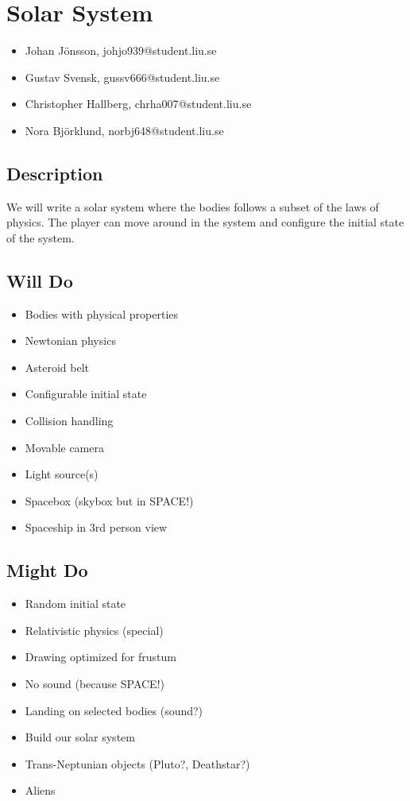 \documentclass{article}
\begin{document}
\section*{Solar System}
\begin{itemize}
        \item Johan J\"onsson, johjo939@student.liu.se
        \item Gustav Svensk, gussv666@student.liu.se
        \item Christopher Hallberg, chrha007@student.liu.se
        \item Nora Bj\"orklund, norbj648@student.liu.se
\end{itemize}

\subsection*{Description}
We will write a solar system where the bodies follows a subset of the laws of 
physics. The player can move around in the system and configure the initial
state of the system.

\subsection*{Will Do}
\begin{itemize}
        \item Bodies with physical properties
        \item Newtonian physics
        \item Asteroid belt
        \item Configurable initial state
        \item Collision handling
        \item Movable camera
        \item Light source(s)
        \item Spacebox (skybox but in SPACE!)
	\item Spaceship in 3rd person view
\end{itemize}

\subsection*{Might Do}
\begin{itemize}
        \item Random initial state
        \item Relativistic physics (special)
        \item Drawing optimized for frustum
        \item No sound (because SPACE!)
        \item Landing on selected bodies (sound?)
        \item Build our solar system
        \item Trans-Neptunian objects (Pluto?, Deathstar?)
        \item Aliens
\end{itemize}
\end{document}

